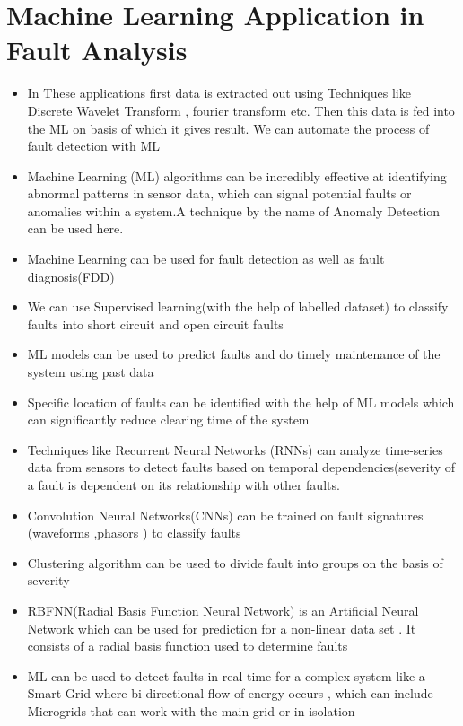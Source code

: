 \documentclass[14pt ,a4paper]{extarticle}
\begin{document}
\section{Machine Learning Application in Fault Analysis}
\begin{itemize}
    \item{In These applications first data is extracted out using Techniques like Discrete Wavelet Transform , fourier transform etc. Then this data is fed into the ML on basis of which it gives result. We can automate the process of fault detection with ML}
    \item{Machine Learning (ML) algorithms can be incredibly effective at identifying abnormal patterns in sensor data, which can signal potential faults or anomalies within a system.A technique by the name of Anomaly Detection can be used here.}
    \item{Machine Learning can be used for fault detection as well as fault diagnosis(FDD)}
    \item{We can use Supervised learning(with the help of labelled dataset) to classify faults into short circuit and open circuit faults}
    \item{ML models can be used to predict faults and do timely maintenance of the system using past data}
    \item{Specific location of faults can be identified with the help of ML models which can significantly reduce clearing time of the system  }
    \item{Techniques like Recurrent Neural Networks (RNNs) can analyze time-series data from sensors to detect faults based on temporal dependencies(severity of a fault is dependent on its relationship with other faults.}
    \item{Convolution Neural Networks(CNNs) can be trained on fault signatures (waveforms ,phasors ) to classify faults  }
    \item{Clustering algorithm can be used to divide fault into groups on the basis of severity}
    \item{RBFNN(Radial Basis Function Neural Network) is an Artificial Neural Network which can be used for prediction for a non-linear data set . It consists of a radial basis function used to determine faults}
    \item{ML can be used to detect faults in real time for a complex system like a Smart Grid where bi-directional flow of energy occurs , which can include Microgrids that can work with the main grid or in isolation}
\end{itemize}
\end{document}
